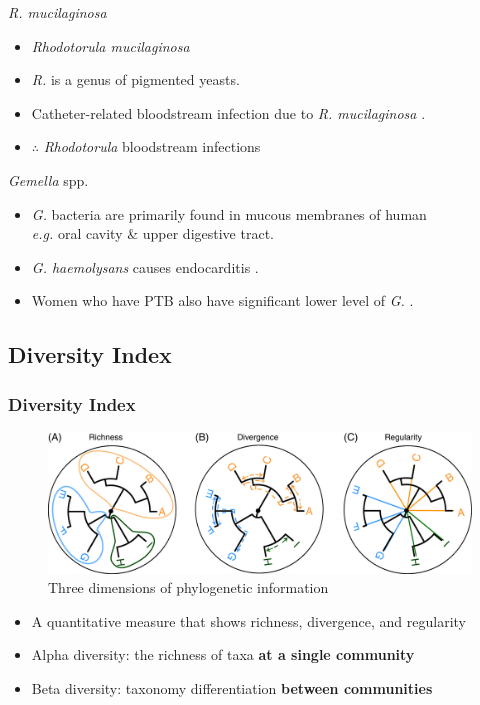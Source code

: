 \documentclass{beamer}
\begin{document}
\begin{frame}[allowframebreaks]
        \begin{block}{\textit{R. mucilaginosa}}
            \begin{itemize}
                \item \textit{Rhodotorula mucilaginosa}
                \item \textit{R.} is a genus of pigmented yeasts.
                \item Catheter-related bloodstream infection due to \textit{R. mucilaginosa} \cite{rhodotorula-1}.
                \item $\therefore$ \textit{Rhodotorula} bloodstream infections
            \end{itemize}
        \end{block}

        \begin{block}{\textit{Gemella} spp.}
            \begin{itemize}
                \item \textit{G.} bacteria are primarily found in mucous membranes of human \\
                    \textit{e.g.} oral cavity \& upper digestive tract.
                \item \textit{G. haemolysans} causes endocarditis \cite{gemella-2}.
                \item Women who have PTB also have significant lower level of \textit{G.} \cite{gemella-1}.
            \end{itemize}
        \end{block}
    \end{frame}

    \subsection{Diversity Index}
    \begin{frame}
        \frametitle{Diversity Index}

        \begin{figure}
            \includegraphics[width=0.6 \linewidth]{figures/phylogenic.jpg}
            \caption{Three dimensions of phylogenetic information \protect\cite{phylogenetic1}}
        \end{figure}

        \begin{itemize}
            \item A quantitative measure that shows richness, divergence, and regularity \cite{phylogenetic1}
            \item Alpha diversity: the richness of taxa \textbf{at a single community}
            \item Beta diversity: taxonomy differentiation \textbf{between communities}
        \end{itemize}
    \end{frame}
\end{document}
